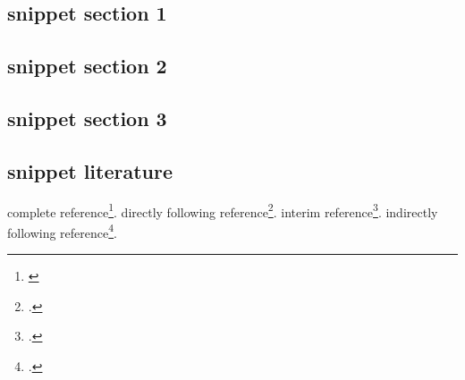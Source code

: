 %
%
%



\subsection{snippet section 1}
\subsection{snippet section 2}
\subsection{snippet section 3}

\subsection{snippet literature}

complete reference\footnote{\cite[cf.][S.1]{Allen2001a}}.
directly following reference\footcite[cf.][S.2]{Allen2001a}.
interim reference\footcite[cf.][S.3]{ModLanAss2009a}.
indirectly following reference\footcite[cf.][S.4]{Allen2001a}.

%
